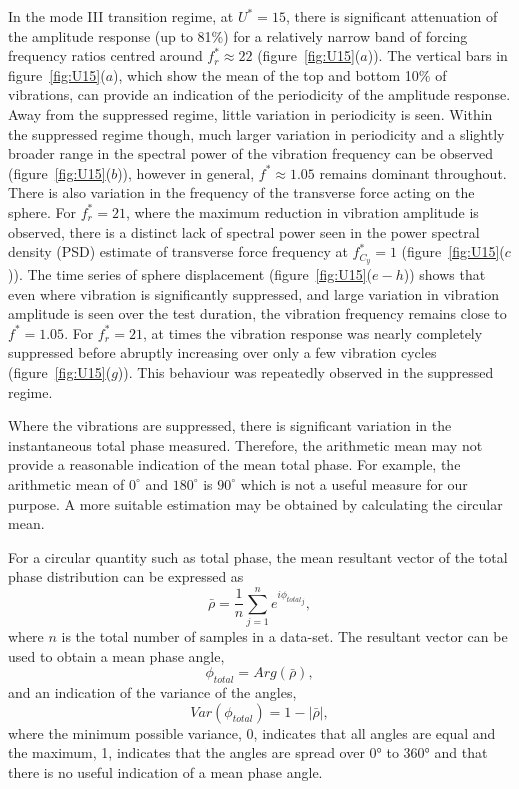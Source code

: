 \documentclass[3p]{elsarticle}
\newcommand{\Ustar}{\ensuremath{U^{*}}}
\newcommand{\fstar}{\ensuremath{f^{*}}}
\newcommand{\freqrat}{\ensuremath{f_r^*}}
\newcommand{\fCy}{\ensuremath{f^*_{C_y}}}
\begin{document}
In the mode III transition regime, at $\Ustar=15$, there is significant attenuation of the amplitude response (up to 81\%) for a relatively narrow band of forcing frequency ratios centred around $\freqrat\approx22$ (figure~\ref{fig:U15}($a$)). 
The vertical bars in figure~\ref{fig:U15}($a$), which show the mean of the top and bottom 10\% of vibrations, can provide an indication of the periodicity of the amplitude response. 
Away from the suppressed regime, little variation in periodicity is seen. 
Within the suppressed regime though, much larger variation in periodicity and a slightly broader range in the spectral power of the vibration frequency can be observed (figure~\ref{fig:U15}($b$)), however in general, $\fstar\approx1.05$ remains dominant throughout. 
There is also variation in the frequency of the transverse force acting on the sphere. 
For $\freqrat=21$, where the maximum reduction in vibration amplitude is observed, there is a distinct lack of spectral power seen in the power spectral density (PSD) estimate of transverse force frequency at $\fCy=1$ (figure~\ref{fig:U15}($c$)). 
The time series of sphere displacement (figure~\ref{fig:U15}($e-h$)) shows that even where vibration is significantly suppressed, and large variation in vibration amplitude is seen over the test duration, the vibration frequency remains close to $\fstar=1.05$. 
For $\freqrat=21$, at times the vibration response was nearly completely suppressed before abruptly increasing over only a few vibration cycles (figure~\ref{fig:U15}($g$)). This behaviour was repeatedly observed in the suppressed regime. 

Where the vibrations are suppressed, there is significant variation in
the instantaneous total phase measured. Therefore, the
arithmetic mean may not provide a reasonable indication of the mean
total phase. For example, the arithmetic mean of $0^\circ$ and
$180^\circ$ is $90^\circ$ which is not a useful measure for our
purpose. A more suitable estimation may be obtained by calculating the
circular mean.

For a circular quantity such as total phase, the mean resultant vector
of the total phase distribution can be expressed as
%
\begin{equation}
\bar{\rho} = \frac{1}{n}\sum_{j=1}^{n}e^{i{\phi_{total}}_j},
\end{equation}
%
where $n$ is the total number of samples in a data-set. The resultant
vector can be used to obtain a mean phase angle,
%
\begin{equation}
\phi_{total} = Arg{(\bar{\rho})},
\end{equation}
%
and an indication of the variance of the angles,
%
\begin{equation}
Var(\phi_{total}) = 1 - |{\bar{\rho}|},
\end{equation}
%
where the minimum possible variance, 0, indicates that all angles are
equal and the maximum, 1, indicates that the angles are spread over
\ang{0} to \ang{360} and that there is no useful indication of a
mean phase angle.
\end{document}
